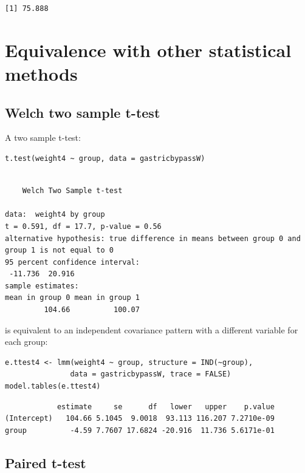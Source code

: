 \documentclass[12pt]{article}
\begin{document}
\begin{verbatim}
[1] 75.888
\end{verbatim}



\clearpage

\section{Equivalence with other statistical methods}
\label{sec:orgba1321e}
\subsection{Welch two sample t-test}
\label{sec:orgfd9b890}

A two sample t-test:
\lstset{language=r,label= ,caption= ,captionpos=b,numbers=none}
\begin{lstlisting}
t.test(weight4 ~ group, data = gastricbypassW)
\end{lstlisting}

\begin{verbatim}

	Welch Two Sample t-test

data:  weight4 by group
t = 0.591, df = 17.7, p-value = 0.56
alternative hypothesis: true difference in means between group 0 and group 1 is not equal to 0
95 percent confidence interval:
 -11.736  20.916
sample estimates:
mean in group 0 mean in group 1 
         104.66          100.07
\end{verbatim}

is equivalent to an independent covariance pattern with a different
variable for each group:
\lstset{language=r,label= ,caption= ,captionpos=b,numbers=none}
\begin{lstlisting}
e.ttest4 <- lmm(weight4 ~ group, structure = IND(~group), 
               data = gastricbypassW, trace = FALSE)
model.tables(e.ttest4)
\end{lstlisting}

\begin{verbatim}
            estimate     se      df   lower   upper    p.value
(Intercept)   104.66 5.1045  9.0018  93.113 116.207 7.2710e-09
group          -4.59 7.7607 17.6824 -20.916  11.736 5.6171e-01
\end{verbatim}


\clearpage

\subsection{Paired t-test}
\label{sec:org3bb7378}
\end{document}
